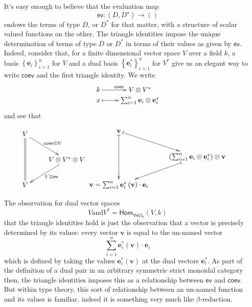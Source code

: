\documentclass[pra,floatfix,
amsmath,superscriptaddress, 12pt]{article}
\theoremstyle{definition}
\newcommand{\evmap}{\mathsf{ev}}
\newcommand{\coev}{\mathsf{coev}}
\begin{document}
It's easy enough to believe that the evaluation map 
\[
\evmap:\left(D,D^{\star}\right)\longrightarrow\left(\right)
\]
 endows the terms of type $D$, or $D^{*}$ for that matter, with a
structure of scalar valued functions on the other. The triangle identities impose the unique determination of terms of type $D$ or $D^*$ in terms of their values as given by $\evmap$.  Indeed, consider that, for a finite dimensional vector space $V$ over a field
$k$, a basis $\left\{ \mathbf{e}_{i}\right\} _{i=1}^{n}$ for $V$
and a dual basis $\left\{ \mathbf{e}_{i}^{*}\right\} _{i=1}^{n}$
for $V^{*}$ give us an elegant way to write $\coev$ and the
first triangle identity. We write
\[
\xymatrixrowsep{0pc}\xymatrix{k\ar[r]^{\coev} & V\otimes V^{*}\\
x\ar@{|->}[r] & \sum_{i=1}^{n}\mathbf{e}_{i}\otimes\mathbf{e}_{i}^{*}
}
\]
and see that

\begin{align*}
    \vcenter{\vbox{\xymatrix{
        V
        \ar@{=}[dd]
        \ar[dr]^{\coev\otimes V}
            \\
            &
            V\otimes V^{*}\otimes V
            \ar[dl]^{V\otimes\evmap}
                \\
        V
    }}}
        &
        \vcenter{\vbox{\xymatrix{
            \mathbf{v}
            \ar@{|->}[dd]
            \ar@{|->}[dr]
                \\
                &
                \left(\sum_{i=1}^{n}\mathbf{e}_{i}\otimes\mathbf{e}_{i}^{*}\right)\otimes\mathbf{v}
                \ar@{|->}[dl]
                    \\
            \mathbf{v}=\sum_{i=1}^{n}\mathbf{e}_{i}^{*}\left(\mathbf{v}\right)\cdot\mathbf{e}_{i}
    }}}
\end{align*}

The observation for dual vector spaces
\[
    V \mathrm{ and } V^*=\mathsf{Hom}_{\mathsf{Vect}_k}\left(V,k \right)
\]
that the triangle identities hold is just the observation that a vector is precisely determined by its values: every vector $\mathbf{v}$  is equal to the un-named vector
\[
\sum_{i=1}^{n}\mathbf{e}_i^*\left( \mathbf{v}\right)\cdot \mathbf{e}_i
\]
which is defined by taking the values $\mathbf{e}^*_{i}\left( \mathbf{v} \right)$ at the dual vectors $\mathbf{e}_i^*$.
As part of the definition of a dual pair in an arbitrary symmetric strict monoidal category then, the triangle identities imposes this as a relationship between $\evmap$ and $\coev$. But within type theory, this sort of relationship between an un-named function and its values is familiar, indeed it is something very much like $\beta$-reduction.
\end{document}
